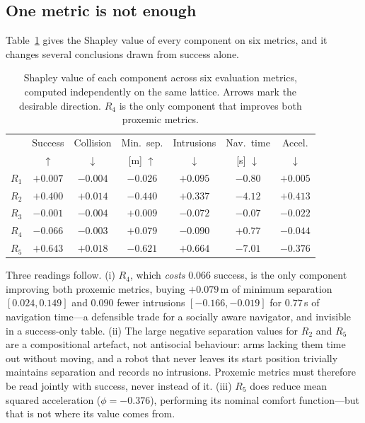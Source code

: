 \documentclass[conference]{IEEEtran}
\begin{document}
\subsection{One metric is not enough}
Table~\ref{tab:multimetric} gives the Shapley value of every component on six
metrics, and it changes several conclusions drawn from success alone.

\begin{table}[!t]
\centering
\caption{Shapley value of each component across six evaluation metrics, computed
independently on the same lattice. Arrows mark the desirable direction. $R_4$ is
the only component that improves both proxemic metrics.}
\label{tab:multimetric}
\small
\setlength{\tabcolsep}{2.6pt}
\begin{tabular}{lcccccc}
\toprule
& Success & Collision & Min.\ sep. & Intrusions & Nav.\ time & Accel. \\
& $\uparrow$ & $\downarrow$ & [m] $\uparrow$ & $\downarrow$ & [s] $\downarrow$ & $\downarrow$ \\
\midrule
$R_1$ & $+0.007$ & $-0.004$ & $-0.026$ & $+0.095$ & $-0.80$ & $+0.005$ \\
$R_2$ & $+0.400$ & $+0.014$ & $-0.440$ & $+0.337$ & $-4.12$ & $+0.413$ \\
$R_3$ & $-0.001$ & $-0.004$ & $+0.009$ & $-0.072$ & $-0.07$ & $-0.022$ \\
$R_4$ & $-0.066$ & $-0.003$ & $\mathbf{+0.079}$ & $\mathbf{-0.090}$ & $+0.77$ & $-0.044$ \\
$R_5$ & $+0.643$ & $+0.018$ & $-0.621$ & $+0.664$ & $-7.01$ & $\mathbf{-0.376}$ \\
\bottomrule
\end{tabular}
\end{table}

Three readings follow. (i) $R_4$, which \emph{costs} $0.066$ success, is the only
component improving both proxemic metrics, buying $+0.079$\,m of minimum
separation $[0.024,0.149]$ and $0.090$ fewer intrusions $[-0.166,-0.019]$ for
$0.77$\,s of navigation time---a defensible trade for a socially aware navigator,
and invisible in a success-only table. (ii) The large negative separation values
for $R_2$ and $R_5$ are a compositional artefact, not antisocial behaviour: arms
lacking them time out without moving, and a robot that never leaves its start
position trivially maintains separation and records no intrusions. Proxemic
metrics must therefore be read jointly with success, never instead of it.
(iii) $R_5$ does reduce mean squared acceleration ($\phi=-0.376$), performing its
nominal comfort function---but that is not where its value comes from.
\end{document}
